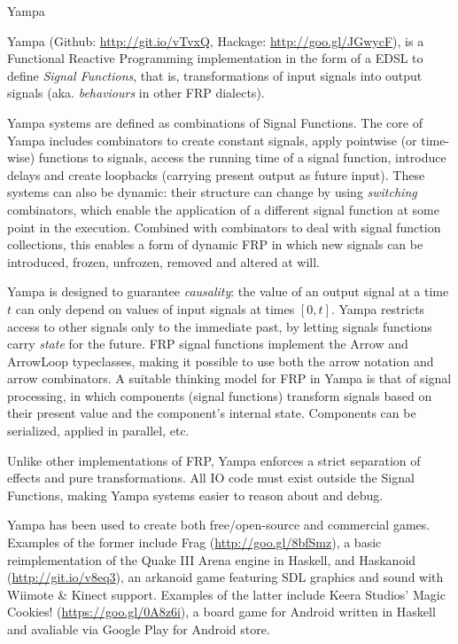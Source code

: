 \begin{hcarentry}{Yampa}
\label{yampa}
\makeheader

% 
% 


Yampa (Github: \href{http://git.io/vTvxQ}{http://git.io/vTvxQ}, Hackage:
\href{http://goo.gl/JGwycF}{http://goo.gl/JGwycF}), is a Functional Reactive
Programming implementation in the form of a EDSL to define \emph{Signal
Functions}, that is, transformations of input signals into output signals (aka.
\emph{behaviours} in other FRP dialects). 

Yampa systems are defined as combinations of Signal Functions. The core of
Yampa includes combinators to create constant signals, apply  pointwise (or
time-wise) functions to signals, access the running time of a signal function,
introduce delays and create loopbacks (carrying present output as future
input). These systems can also be dynamic: their structure can change by using
\emph{switching} combinators, which enable the application of a different
signal function at some point in the execution. Combined with combinators to
deal with signal function collections, this enables a form of dynamic FRP in
which new signals can be introduced, frozen, unfrozen, removed and altered at
will.

Yampa is designed to guarantee \emph{causality}: the value of an output signal
at a time $t$ can only depend on values of input signals at times $[0,t]$.
Yampa restricts access to other signals only to the immediate past, by letting
signals functions carry \emph{state} for the future.  FRP signal functions
implement the Arrow and ArrowLoop typeclasses, making it possible to
use both the arrow notation and arrow combinators. A suitable thinking model
for FRP in Yampa is that of signal processing, in which components (signal
functions) transform signals based on their present value and the component's
internal state. Components can be serialized, applied in parallel, etc.

Unlike other implementations of FRP, Yampa enforces a strict separation of
effects and pure transformations. All IO code must exist outside the Signal
Functions, making Yampa systems easier to reason about and debug.

Yampa has been used to create both free/open-source and commercial games.
Examples of the former include Frag (\href{http://goo.gl/8bfSmz}{http://goo.gl/8bfSmz}), a basic
reimplementation of the Quake III Arena engine in Haskell, and Haskanoid
(\href{http://git.io/v8eq3}{http://git.io/v8eq3}), an arkanoid game featuring
SDL graphics and sound with Wiimote \& Kinect support. Examples of the latter
include Keera Studios' Magic Cookies!
(\href{https://goo.gl/0A8z6i}{https://goo.gl/0A8z6i}), a board game for Android
written in Haskell and avaliable via Google Play for Android store.


\end{hcarentry}
